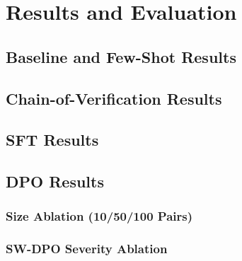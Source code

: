 \documentclass[12pt,a4paper,oneside]{report}
\begin{document}
\chapter{Results and Evaluation}
\label{ch:results}


\section{Baseline and Few-Shot Results}
\label{sec:baseline-results}
%

\section{Chain-of-Verification Results}
\label{sec:cove-results}

\section{SFT Results}
\label{sec:sft-results}

\section{DPO Results}
\label{sec:dpo-results}

\subsection{Size Ablation (10/50/100 Pairs)}
\label{subsec:dpo-size}

\subsection{SW-DPO Severity Ablation}
\label{subsec:swdpo-results}
\end{document}
